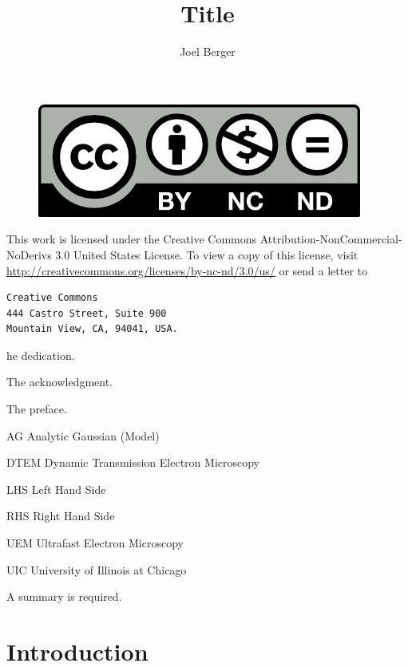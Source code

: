 \documentclass{uicthesi}
\title{Title}
\author{Joel Berger}
\begin{document}
\maketitle

\newpage
\begin{figure}
  \centering
  \includegraphics{by-nc-nd}
\end{figure}
This work is licensed under the Creative Commons Attribution-NonCommercial-NoDerivs 3.0 United States License.
To view a copy of this license, visit \url{http://creativecommons.org/licenses/by-nc-nd/3.0/us/} or send a letter to
\begin{verbatim}
Creative Commons
444 Castro Street, Suite 900
Mountain View, CA, 94041, USA.
\end{verbatim}


\dedication
The dedication.
 
\acknowledgment
The acknowledgment.
 
\preface
The preface.
 
\tableofcontents
\listoftables
\listoffigures
 
\listofabbreviations
\begin{list}
  {}
  {\setlength{\labelwidth}{1in}
   \setlength{\leftmargin}{1.5in}
   \setlength{\labelsep}{.5in}
   \setlength{\rightmargin}{\leftmargin}}

  \item[AG\hfill] Analytic Gaussian (Model)
  \item[DTEM\hfill] Dynamic Transmission Electron Microscopy
  \item[LHS\hfill] Left Hand Side
  \item[RHS\hfill] Right Hand Side
  \item[UEM\hfill] Ultrafast Electron Microscopy
  \item[UIC\hfill] University of Illinois at Chicago
\end{list}
 
\summary
A summary is required.

\chapter{Introduction}
\end{document}
